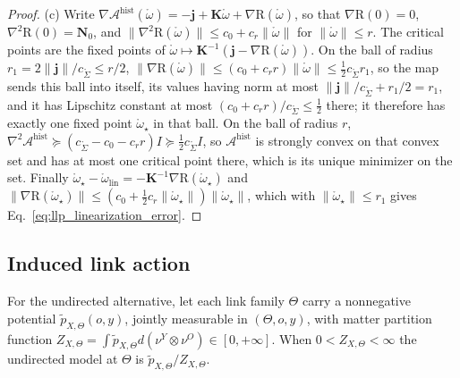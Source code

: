 \begin{proof}
(c) Write $\nabla\mathcal A^{\mathrm{hist}}(\mathring\omega)=-\mathbf j+\mathbf K\mathring\omega+\nabla\mathrm R(\mathring\omega)$, so that $\nabla\mathrm R(0)=0$, $\nabla^2\mathrm R(0)=\mathbf N_0$, and $\|\nabla^2\mathrm R(\mathring\omega)\|\leq c_0+c_r\|\mathring\omega\|$ for $\|\mathring\omega\|\leq r$. The critical points are the fixed points of $\mathring\omega\mapsto\mathbf K^{-1}(\mathbf j-\nabla\mathrm R(\mathring\omega))$. On the ball of radius $r_1=2\|\mathbf j\|/c_{\mathring\Sigma}\leq r/2$, $\|\nabla\mathrm R(\mathring\omega)\|\leq(c_0+c_rr)\|\mathring\omega\|\leq\frac12c_{\mathring\Sigma}r_1$, so the map sends this ball into itself, its values having norm at most $\|\mathbf j\|/c_{\mathring\Sigma}+r_1/2=r_1$, and it has Lipschitz constant at most $(c_0+c_rr)/c_{\mathring\Sigma}\leq\frac12$ there; it therefore has exactly one fixed point $\mathring\omega_\star$ in that ball. On the ball of radius $r$, $\nabla^2\mathcal A^{\mathrm{hist}}\succeq(c_{\mathring\Sigma}-c_0-c_rr)I\succeq\frac12c_{\mathring\Sigma}I$, so $\mathcal A^{\mathrm{hist}}$ is strongly convex on that convex set and has at most one critical point there, which is its unique minimizer on the set. Finally $\mathring\omega_\star-\mathring\omega_{\mathrm{lin}}=-\mathbf K^{-1}\nabla\mathrm R(\mathring\omega_\star)$ and $\|\nabla\mathrm R(\mathring\omega_\star)\|\leq(c_0+\frac12c_r\|\mathring\omega_\star\|)\|\mathring\omega_\star\|$, which with $\|\mathring\omega_\star\|\leq r_1$ gives Eq.~\eqref{eq:llp_linearization_error}.
\end{proof}

\subsection{Induced link action}\label{app:llp_induced}

For the undirected alternative, let each link family $\Theta$ carry a nonnegative potential $\widetilde p_{X,\Theta}(o,y)$, jointly measurable in $(\Theta,o,y)$, with matter partition function $Z_{X,\Theta}=\int\widetilde p_{X,\Theta}d(\nu^Y\otimes\nu^O)\in[0,+\infty]$. When $0<Z_{X,\Theta}<\infty$ the undirected model at $\Theta$ is $\widetilde p_{X,\Theta}/Z_{X,\Theta}$.

